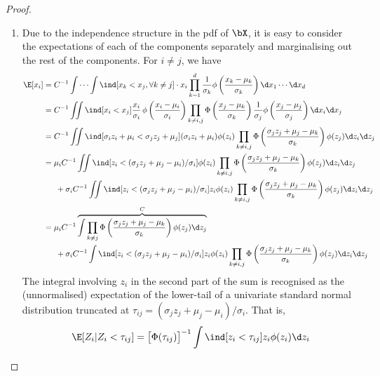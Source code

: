 \documentclass[]{article}
\begin{document}
\begin{proof}
\begin{enumerate}[label=(\roman*)]
  \item Due to the independence structure in the pdf of $\bX$, it is easy to consider the expectations of each of the components separately and marginalising out the rest of the components. For $i \neq j$, we have
  \begin{align*}
    \E[x_i] 
    &= C^{-1} \idotsint \ind[x_k < x_j, \forall k \neq j] \cdot x_i  \prod_{k=1}^d \frac{1}{\sigma_k}\phi \left( \frac{x_k - \mu_k}{\sigma_k} \right) \d x_1 \cdots \d x_d \\
    &= C^{-1} \iint \ind[x_i < x_j] \frac{x_i}{\sigma_i} \, \phi \left( \frac{x_i - \mu_i}{\sigma_i} \right)  \prod_{k \neq i,j} \Phi \left( \frac{x_j - \mu_k}{\sigma_k} \right) \frac{1}{\sigma_j}\phi \left( \frac{x_j - \mu_j}{\sigma_j} \right) \d x_i \d x_j \\
    &= C^{-1} \iint \ind[\sigma_i z_i + \mu_i < \sigma_j z_j + \mu_j] (\sigma_i z_i + \mu_i) \phi (z_i)  \prod_{k \neq i,j} \Phi \left( \frac{\sigma_j z_j + \mu_j - \mu_k}{\sigma_k} \right) \phi (z_j) \d z_i \d z_j \\
    &= \mu_i C^{-1} \iint \ind[ z_i < (\sigma_j z_j + \mu_j - \mu_i) / \sigma_i] \phi (z_i)  \prod_{k \neq i,j} \Phi \left( \frac{\sigma_j z_j + \mu_j - \mu_k}{\sigma_k} \right) \phi (z_j) \d z_i \d z_j \\*    
    &\phantom{==} + \sigma_i C^{-1} \iint \ind[z_i < (\sigma_j z_j + \mu_j - \mu_i) / \sigma_i] z_i \phi (z_i)  \prod_{k \neq i,j} \Phi \left( \frac{\sigma_j z_j + \mu_j - \mu_k}{\sigma_k} \right) \phi (z_j) \d z_i \d z_j \\
    &= \mu_i C^{-1} 
    \overbrace{
    \int  \prod_{k \neq j} \Phi \left( \frac{\sigma_j z_j + \mu_j - \mu_k}{\sigma_k} \right) \phi (z_j) \d z_j
    }^{C} \\  
    &\phantom{==} + \sigma_i C^{-1} \int \ind[ z_i < (\sigma_j z_j + \mu_j - \mu_i) / \sigma_i] z_i \phi (z_i) \prod_{k \neq i,j} \Phi \left( \frac{\sigma_j z_j + \mu_j - \mu_k}{\sigma_k} \right) \phi (z_j) \d z_i \d z_j \\
  \end{align*}
  The integral involving $z_i$ in the second part of the sum is recognised as the (unnormalised) expectation of the lower-tail of a univariate standard normal distribution truncated at $\tau_{ij} = (\sigma_j z_j + \mu_j - \mu_i) / \sigma_i$. That is,
  \[
    \E[Z_i | Z_i < \tau_{ij}] 
    = \big[\Phi(\tau_{ij})\big]^{-1} \int \ind [z_i < \tau_{ij}] z_i \phi(z_i) \d z_i 
\]
\end{enumerate}
\end{proof}
\end{document}
